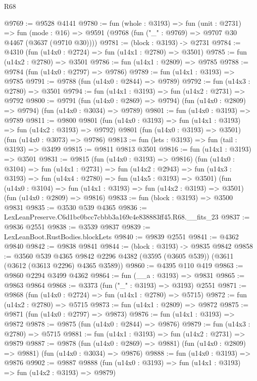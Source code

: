 \begin{lexlean}{R68}
\begin{coremodule}
@9769 := @9528 @4141
@9780 := fun (whole : @3193) =>
  fun (unit : @2731) =>
  fun (mode : @16) => @9591 (@9768 (fun ("_" : @9769) => @9707 @30 @4467 (@3637 (@9710 @30))))
@9781 := (block : @3193) -> @2731
@9784 := @4310 (fun (u14x0 : @2724) => fun (u14x1 : @2780) => @3501)
@9785 := fun (u14x2 : @2780) => @3501
@9786 := fun (u14x1 : @2809) => @9785
@9788 := @9784 (fun (u14x0 : @2797) => @9786)
@9789 := fun (u14x1 : @3193) => @9785
@9791 := @9788 (fun (u14x0 : @2844) => @9789)
@9792 := fun (u14x3 : @2780) => @3501
@9794 := fun (u14x1 : @3193) => fun (u14x2 : @2731) => @9792
@9800 := @9791
    (fun (u14x0 : @2869) => @9794)
    (fun (u14x0 : @2809) => @9794)
    (fun (u14x0 : @3034) => @9789)
@9801 := fun (u14x0 : @3193) => @9789
@9811 := @9800
    @9801
    (fun (u14x0 : @3193) => fun (u14x1 : @3193) => fun (u14x2 : @3193) => @9792)
    @9801
    (fun (u14x0 : @3193) => @3501)
    (fun (u14x0 : @3073) => @9786)
@9813 := fun (lets : @3193) => fun (tail : @3193) => @3499
@9815 := @9811 @9813 @3501
@9816 := fun (u14x1 : @3193) => @3501
@9831 := @9815
    (fun (u14x0 : @3193) => @9816)
    (fun (u14x0 : @3104) =>
    fun (u14x1 : @2731) =>
    fun (u14x2 : @2943) =>
    fun (u14x3 : @3193) => fun (u14x4 : @2780) => fun (u14x5 : @3193) => @3501)
    (fun (u14x0 : @3104) => fun (u14x1 : @3193) => fun (u14x2 : @3193) => @3501)
    (fun (u14x0 : @2809) => @9816)
@9833 := fun (block : @3193) => @3500 @9831
@9835 := @3530 @539 @4365
@9836 := LexLeanPreserve.C6d1bc0bcc7cbbb3a169c4e838883ff45.R68.__fits_23
@9837 := @9836 @2551
@9838 := @3539 @9837
@9839 := LexLeanBoot.RustBodies.blockLets
@9840 := @9839 @2551
@9841 := @4362 @9840
@9842 := @9838 @9841
@9844 := (block : @3193) -> @9835 @9842
@9858 := @3560
    @539
    @4365
    @9842
    @2296
    @4382
    (@3595 (@3605 @539))
    (@3611 (@3612 (@3613 @2296) @4365 @3589))
@9860 := @4395 @110 @419
@9863 := @9860 @2294 @3499 @4362
@9864 := fun (__a : @3193) => @9831
@9865 := @9863 @9864
@9868 := @3373 (fun ("_" : @3193) => @3193) @2551
@9871 := @9868 (fun (u14x0 : @2724) => fun (u14x1 : @2780) => @5715)
@9872 := fun (u14x2 : @2780) => @5715
@9873 := fun (u14x1 : @2809) => @9872
@9875 := @9871 (fun (u14x0 : @2797) => @9873)
@9876 := fun (u14x1 : @3193) => @9872
@9878 := @9875 (fun (u14x0 : @2844) => @9876)
@9879 := fun (u14x3 : @2780) => @5715
@9881 := fun (u14x1 : @3193) => fun (u14x2 : @2731) => @9879
@9887 := @9878
    (fun (u14x0 : @2869) => @9881)
    (fun (u14x0 : @2809) => @9881)
    (fun (u14x0 : @3034) => @9876)
@9888 := fun (u14x0 : @3193) => @9876
@9902 := @9887
    @9888
    (fun (u14x0 : @3193) => fun (u14x1 : @3193) => fun (u14x2 : @3193) => @9879)

\end{coremodule}
\end{lexlean}
